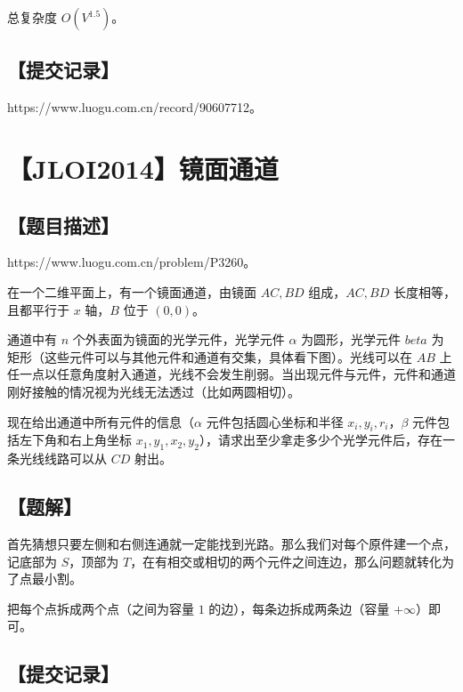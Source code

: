 \documentclass[UTF8,12pt,a4paper]{ctexart}
\begin{document}
	总复杂度 $O(V^{1.5})$。
	
	\subsection*{【提交记录】}
	
	https://www.luogu.com.cn/record/90607712。
	
	
	\section*{【JLOI2014】镜面通道}
	
	\subsection*{【题目描述】}
	
	https://www.luogu.com.cn/problem/P3260。
	
	在一个二维平面上，有一个镜面通道，由镜面 $AC, BD$ 组成，$AC, BD$ 长度相等，且都平行于 $x$ 轴，$B$ 位于 $(0,0)$。
	
	通道中有 $n$ 个外表面为镜面的光学元件，光学元件 $\alpha$ 为圆形，光学元件 $beta$ 为矩形（这些元件可以与其他元件和通道有交集，具体看下图）。光线可以在 $AB$ 上任一点以任意角度射入通道，光线不会发生削弱。当出现元件与元件，元件和通道刚好接触的情况视为光线无法透过（比如两圆相切）。
	
	现在给出通道中所有元件的信息（$\alpha$ 元件包括圆心坐标和半径 $x_i, y_i, r_i$，$\beta$ 元件包括左下角和右上角坐标 $x_1, y_1, x_2, y_2$），请求出至少拿走多少个光学元件后，存在一条光线线路可以从 $CD$ 射出。
	
	\subsection*{【题解】}
	
	首先猜想只要左侧和右侧连通就一定能找到光路。那么我们对每个原件建一个点，记底部为 $S$，顶部为 $T$，在有相交或相切的两个元件之间连边，那么问题就转化为了点最小割。
	
	把每个点拆成两个点（之间为容量 $1$ 的边），每条边拆成两条边（容量 $+\infty$）即可。
	
	\subsection*{【提交记录】}
	
\end{document}
